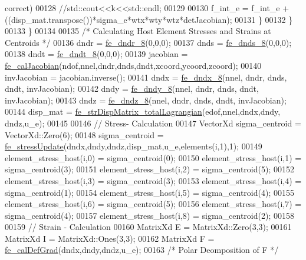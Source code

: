 \begin{DoxyCode}
{       correct)}
00128                 \textcolor{comment}{//std::cout<<k<<std::endl;}
00129 
00130                 f\_int\_e = f\_int\_e + ((disp\_mat.transpose())*sigma\_e*wtx*wty*wtz*detJacobian);
00131             \}
00132         \}
00133     \}
00134 
00135     \textcolor{comment}{/* Calculating Host Element Stresses and Strains at Centroids */}
00136         dndr = \hyperlink{functions_8h_afc547bef246c057db6cbd04bf7f866a9}{fe\_dndr\_8}(0,0,0);
00137         dnds = \hyperlink{functions_8h_ac0b5524525e1f2e89bb064c15ab8e664}{fe\_dnds\_8}(0,0,0);
00138         dndt = \hyperlink{functions_8h_a57e8e5c9f740c98e4767f29c121c2d0a}{fe\_dndt\_8}(0,0,0);
00139         jacobian = \hyperlink{functions_8h_a5ae3771e65b4a0d177097041a4349c28}{fe\_calJacobian}(ndof,nnel,dndr,dnds,dndt,xcoord,ycoord,zcoord);
00140         invJacobian = jacobian.inverse();
00141         dndx = \hyperlink{functions_8h_afc6be1a5667e68156cb099e8da71170f}{fe\_dndx\_8}(nnel, dndr, dnds, dndt, invJacobian);
00142         dndy = \hyperlink{functions_8h_a0572d7818e085c67f7fbb84eef8ecfb4}{fe\_dndy\_8}(nnel, dndr, dnds, dndt, invJacobian);
00143         dndz = \hyperlink{functions_8h_aaf75db8433433807839c6ea17f2cf72c}{fe\_dndz\_8}(nnel, dndr, dnds, dndt, invJacobian);
00144         disp\_mat = \hyperlink{functions_8h_a8c9fd519c93c847cdf52de947964eb67}{fe\_strDispMatrix\_totalLagrangian}(edof,nnel,dndx,dndy,
      dndz,u\_e);
00145 
00146         \textcolor{comment}{// Stress- Calculation}
00147         VectorXd sigma\_centroid = VectorXd::Zero(6);
00148         sigma\_centroid = \hyperlink{functions_8h_a7d0fd8cfef8b891901eb6f0f780fd9f2}{fe\_stressUpdate}(dndx,dndy,dndz,disp\_mat,u\_e,elements(i,1),1);
00149         element\_stress\_host(i,0) = sigma\_centroid(0);
00150         element\_stress\_host(i,1) = sigma\_centroid(3);
00151         element\_stress\_host(i,2) = sigma\_centroid(5);
00152         element\_stress\_host(i,3) = sigma\_centroid(3);
00153         element\_stress\_host(i,4) = sigma\_centroid(1);
00154         element\_stress\_host(i,5) = sigma\_centroid(4);
00155         element\_stress\_host(i,6) = sigma\_centroid(5);
00156         element\_stress\_host(i,7) = sigma\_centroid(4);
00157         element\_stress\_host(i,8) = sigma\_centroid(2);
00158 
00159         \textcolor{comment}{// Strain - Calculation}
00160         MatrixXd E = MatrixXd::Zero(3,3);
00161         MatrixXd I = MatrixXd::Ones(3,3);
00162         MatrixXd F = \hyperlink{functions_8h_ae50379f74802347e04dbc022897f9cb0}{fe\_calDefGrad}(dndx,dndy,dndz,u\_e);
00163         \textcolor{comment}{/* Polar Deomposition of F */}

\end{DoxyCode}
